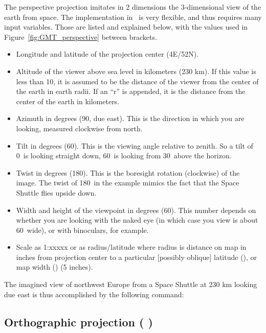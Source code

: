 The perspective projection imitates in 2 dimensions the 3-dimensional view of the
earth from space. The implementation in \GMT\ is very flexible, and thus requires
many input variables. Those are listed and explained below, with the values used in
Figure~\ref{fig:GMT_perspective} between brackets.

\begin{itemize}
\item Longitude and latitude of the projection center (4\DS E/52\DS N).
\item Altitude of the viewer above sea level in kilometers (230 km). If this value is less than
10, it is assumed to be the distance of the viewer from the center of the earth in earth radii.
If an ``r'' is appended, it is the distance from the center of the earth in kilometers.
\item Azimuth in degrees (90\DS, due east). This is the direction in which you are looking, measured
clockwise from north.
\item Tilt in degrees (60\DS). This is the viewing angle relative to zenith. So a tilt of 0\DS\ is
looking straight down, 60\DS\ is looking from 30\DS\ above the horizon.
\item Twist in degrees (180\DS). This is the boresight rotation (clockwise) of the image. The twist
of 180\DS\ in the example mimics the fact that the Space Shuttle flies upside down.
\item Width and height of the viewpoint in degrees (60\DS). This number depends on whether you are
looking with the naked eye (in which case you view is about 60\DS\ wide), or with binoculars, for
example.
\item Scale as 1:xxxxx or as radius/latitude where
radius is distance on map in inches from projection center to
a particular [possibly oblique] latitude (), or map
width () (5 inches).
\end{itemize}

The imagined view of northwest Europe from a Space Shuttle at 230 km looking due east is thus
accomplished by the following  command:




\subsection{Orthographic projection ( )}

